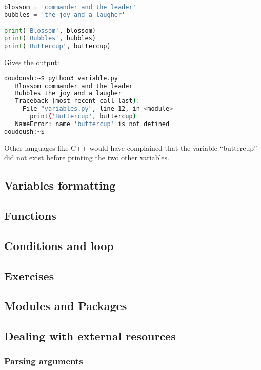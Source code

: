 \begin{lstlisting}[language=python]
blossom = 'commander and the leader'
bubbles = 'the joy and a laugher'

print('Blossom', blossom)
print('Bubbles', bubbles)
print('Buttercup', buttercup)
\end{lstlisting}

Gives the output:

\begin{lstlisting}[language=bash]
doudoush:~$ python3 variable.py
   Blossom commander and the leader
   Bubbles the joy and a laugher
   Traceback (most recent call last):
     File "variables.py", line 12, in <module>
       print('Buttercup', buttercup)
   NameError: name 'buttercup' is not defined
doudoush:~$
\end{lstlisting}

Other languages like C++ would have complained that the variable ``buttercup''
did not exist before printing the two other variables.

\subsection{Variables formatting}

\subsection{Functions}

\subsection{Conditions and loop}

\subsection{Exercises}

\subsection{Modules and Packages}

\subsection{Dealing with external resources}
\subsubsection{Parsing arguments}
